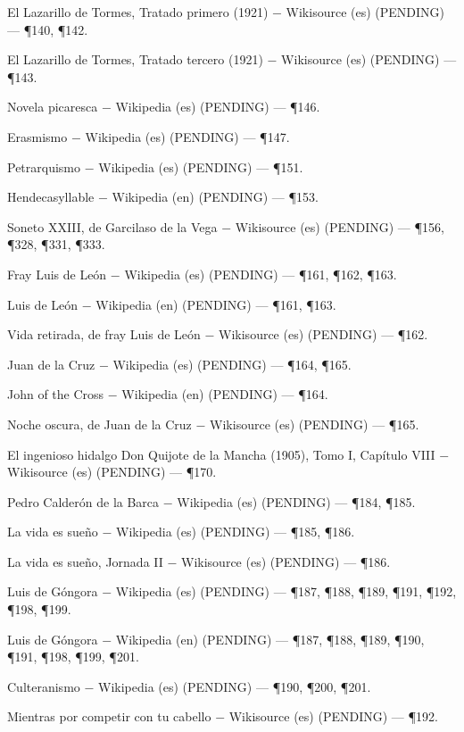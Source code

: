 \documentclass{book}
\begin{document}
\noindent El Lazarillo de Tormes, Tratado primero (1921) \(-\) Wikisource (es) (PENDING) --- \P140, \P142.

\noindent El Lazarillo de Tormes, Tratado tercero (1921) \(-\) Wikisource (es) (PENDING) --- \P143.

\noindent Novela picaresca \(-\) Wikipedia (es) (PENDING) --- \P146.

\noindent Erasmismo \(-\) Wikipedia (es) (PENDING) --- \P147.

\noindent Petrarquismo \(-\) Wikipedia (es) (PENDING) --- \P151.

\noindent Hendecasyllable \(-\) Wikipedia (en) (PENDING) --- \P153.

\noindent Soneto XXIII, de Garcilaso de la Vega \(-\) Wikisource (es) (PENDING) --- \P156, \P328, \P331, \P333.

\noindent Fray Luis de León \(-\) Wikipedia (es) (PENDING) --- \P161, \P162, \P163.

\noindent Luis de León \(-\) Wikipedia (en) (PENDING) --- \P161, \P163.

\noindent Vida retirada, de fray Luis de León \(-\) Wikisource (es) (PENDING) --- \P162.

\noindent Juan de la Cruz \(-\) Wikipedia (es) (PENDING) --- \P164, \P165.

\noindent John of the Cross \(-\) Wikipedia (en) (PENDING) --- \P164.

\noindent Noche oscura, de Juan de la Cruz \(-\) Wikisource (es) (PENDING) --- \P165.

\noindent El ingenioso hidalgo Don Quijote de la Mancha (1905), Tomo I, Capítulo VIII \(-\) Wikisource (es) (PENDING) --- \P170.

\noindent Pedro Calderón de la Barca \(-\) Wikipedia (es) (PENDING) --- \P184, \P185.

\noindent La vida es sueño \(-\) Wikipedia (es) (PENDING) --- \P185, \P186.

\noindent La vida es sueño, Jornada II \(-\) Wikisource (es) (PENDING) --- \P186.

\noindent Luis de Góngora \(-\) Wikipedia (es) (PENDING) --- \P187, \P188, \P189, \P191, \P192, \P198, \P199.

\noindent Luis de Góngora \(-\) Wikipedia (en) (PENDING) --- \P187, \P188, \P189, \P190, \P191, \P198, \P199, \P201.

\noindent Culteranismo \(-\) Wikipedia (es) (PENDING) --- \P190, \P200, \P201.

\noindent Mientras por competir con tu cabello \(-\) Wikisource (es) (PENDING) --- \P192.
\end{document}
